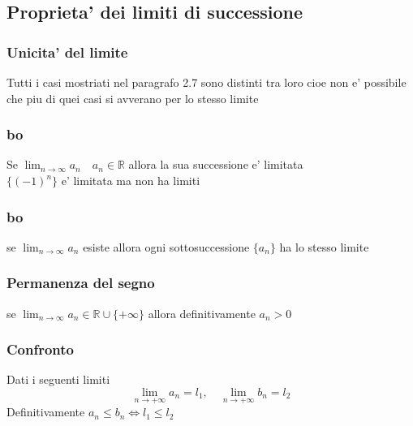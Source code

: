 \documentclass{article}
\begin{document}
\begin{flushleft}
\begin{flushleft}
\begin{flushleft}
            \subsection{Proprieta' dei limiti di successione}
                \subsubsection{Unicita' del limite}
                \begin{flushleft}
                    Tutti i casi mostriati nel paragrafo 2.7 sono distinti tra loro cioe
                    non e' possibile che piu di quei casi si avverano per lo stesso limite
                \end{flushleft}
                \subsubsection{bo}
                \begin{flushleft}
                    Se $\lim_{n \to \infty} a_n \quad a_n \in \mathbb{R}$ allora la sua successione e' limitata\\
                    $\{(-1)^n\}$ e' limitata ma non ha limiti
                \end{flushleft}
                \subsubsection{bo}
                \begin{flushleft}
                    se $\lim_{n \to \infty} a_n $ esiste allora ogni sottosuccessione $\{a_n\}$ ha lo stesso limite
                \end{flushleft}
            \end{flushleft}
                \subsubsection{Permanenza del segno}
                \begin{flushleft}
                    se $\lim_{n \to \infty} a_n  \in \mathbb{R} \cup \{+\infty\}$ allora definitivamente $a_n > 0$
                \end{flushleft}
                \subsubsection{Confronto}
                \begin{flushleft}
                    Dati i seguenti limiti
                    \begin{equation}
                        \lim_{n\to+\infty} a_n = l_1,\quad  \lim_{n\to+\infty} b_n = l_2
                    \end{equation}
                    Definitivamente $a_n \leq b_n \iff l_1 \leq l_2$
                \end{flushleft}

\end{flushleft}
\end{flushleft}
\end{document}
